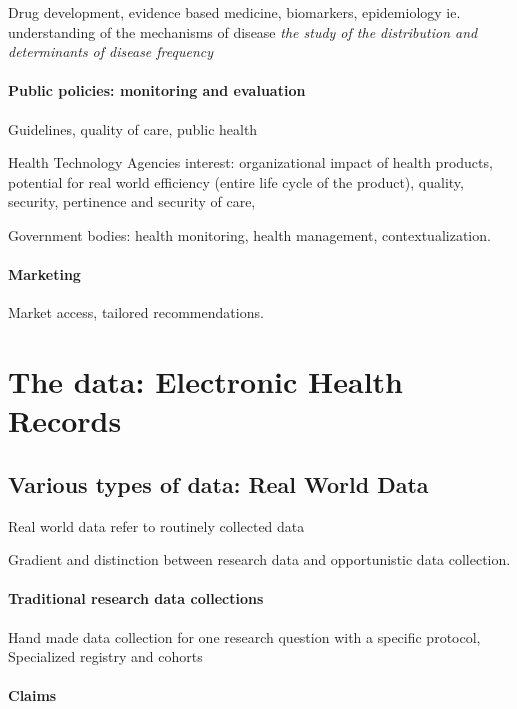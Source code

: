 \documentclass{report}
\begin{document}
Drug development, evidence based medicine, biomarkers, epidemiology ie.
understanding of the mechanisms of disease \textit{the study of the distribution
  and determinants of disease frequency} \citep{macmahon1970epidemiology}

\paragraph{Public policies: monitoring and evaluation}

Guidelines, quality of care, public health

Health Technology Agencies interest: organizational impact of health products,
potential for real world efficiency (entire life cycle of the product), quality,
security, pertinence and security of care,

Government bodies: health monitoring, health management, contextualization.

\paragraph{Marketing}

Market access, tailored recommendations.

\section{The data: Electronic Health Records}\label{sec:intro:data}

\subsection{Various types of data: Real World Data}\label{subsec:intro:real_world_data}

Real world data refer to routinely collected data

Gradient and distinction between research data and opportunistic data
collection.

\paragraph{Traditional research data collections}

Hand made data collection for one research question with a specific protocol,
Specialized registry and cohorts


\paragraph{Claims}
\end{document}
